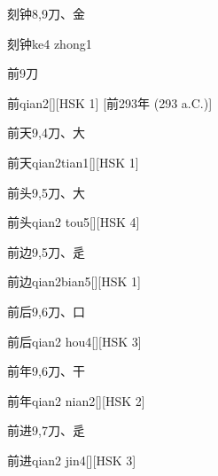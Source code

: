 \begin{entry}{刻钟}{8,9}{⼑、⾦}
  \begin{phonetics}{刻钟}{ke4 zhong1}
  \end{phonetics}
\end{entry}

\begin{entry}{前}{9}{⼑}
  \begin{phonetics}{前}{qian2}[][HSK 1]
    [前293年  (293 a.C.)]
  \end{phonetics}
\end{entry}

\begin{entry}{前天}{9,4}{⼑、⼤}
  \begin{phonetics}{前天}{qian2tian1}[][HSK 1]
  \end{phonetics}
\end{entry}

\begin{entry}{前头}{9,5}{⼑、⼤}
  \begin{phonetics}{前头}{qian2 tou5}[][HSK 4]
  \end{phonetics}
\end{entry}

\begin{entry}{前边}{9,5}{⼑、⾡}
  \begin{phonetics}{前边}{qian2bian5}[][HSK 1]
  \end{phonetics}
\end{entry}

\begin{entry}{前后}{9,6}{⼑、⼝}
  \begin{phonetics}{前后}{qian2 hou4}[][HSK 3]
  \end{phonetics}
\end{entry}

\begin{entry}{前年}{9,6}{⼑、⼲}
  \begin{phonetics}{前年}{qian2 nian2}[][HSK 2]
  \end{phonetics}
\end{entry}

\begin{entry}{前进}{9,7}{⼑、⾡}
  \begin{phonetics}{前进}{qian2 jin4}[][HSK 3]
  \end{phonetics}
\end{entry}

